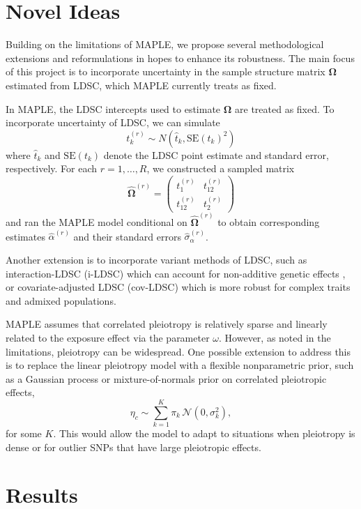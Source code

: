 \documentclass[12pt]{article}
\begin{document}
\section{Novel Ideas}\label{sec:new_methods}

Building on the limitations of MAPLE, we propose several methodological extensions and reformulations in hopes to enhance its robustness. The main focus of this project is to incorporate uncertainty in the sample structure matrix $\boldsymbol{\Omega}$ estimated from LDSC, which MAPLE currently treats as fixed. 

In MAPLE, the LDSC intercepts used to estimate $\boldsymbol\Omega$ are treated as fixed. To incorporate uncertainty of LDSC, we can simulate
\[
\label{eq:ldsc_sim}
t_k^{(r)} \sim N(\hat{t}_k, \mathrm{SE}(t_k)^2)
\] 
where $\hat{t}_k$ and $\mathrm{SE}(t_k)$ denote the LDSC point estimate and standard error, respectively. For each $r = 1, \ldots, R$, we constructed a sampled matrix
\[
\label{eq:omega_sim}
\boldsymbol{\hat\Omega}^{(r)} =
\begin{pmatrix}
t_1^{(r)} & t_{12}^{(r)} \\
t_{12}^{(r)} & t_2^{(r)}
\end{pmatrix}
\]
and ran the MAPLE model conditional on $\boldsymbol{\hat\Omega}^{(r)}$ to obtain corresponding estimates $\hat{\alpha}^{(r)}$ and their standard errors $\hat{\sigma}_{\alpha}^{(r)}$.

Another extension is to incorporate variant methods of LDSC, such as interaction-LDSC (i-LDSC) which can account for non-additive genetic effects \citep{PattilloSmith2024}, or covariate-adjusted LDSC (cov-LDSC) \citep{Luo2018} which is more robust for complex traits and admixed populations.

MAPLE assumes that correlated pleiotropy is relatively sparse and linearly related to the exposure effect via the parameter $\omega$. However, as noted in the limitations, pleiotropy can be widespread. One possible extension to address this is to replace the linear pleiotropy model with a flexible nonparametric prior, such as a Gaussian process or mixture-of-normals prior on correlated pleiotropic effects,
\[
\eta_c \sim \sum_{k=1}^K \pi_k \, \mathcal{N}(0, \sigma_k^2),
\]
for some $K$. This would allow the model to adapt to situations when pleiotropy is dense or for outlier SNPs that have large pleiotropic effects.


\section{Results}
\end{document}
